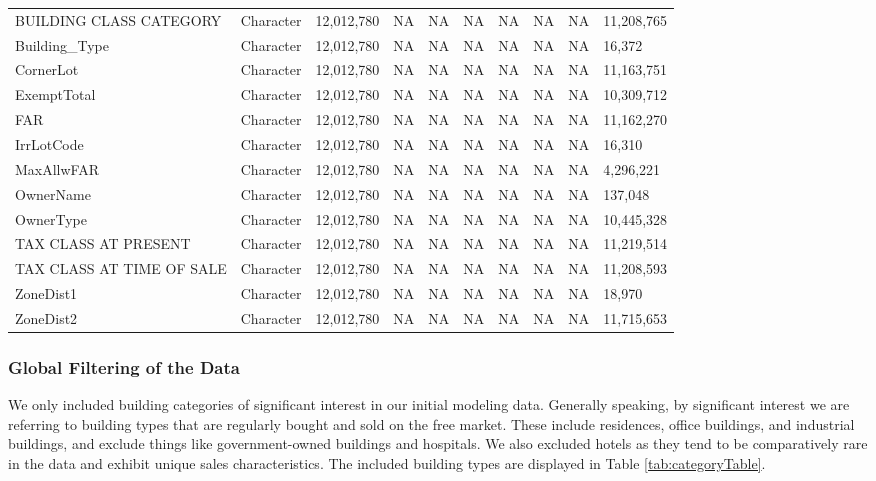 \documentclass[12pt,]{article}
\begin{document}
\begin{table}
{\begin{tabular}[t]{llllllllll}
\addlinespace
BUILDING CLASS CATEGORY & Character & 12,012,780 & NA & NA & NA & NA & NA & NA & 11,208,765\\
Building\_Type & Character & 12,012,780 & NA & NA & NA & NA & NA & NA & 16,372\\
CornerLot & Character & 12,012,780 & NA & NA & NA & NA & NA & NA & 11,163,751\\
ExemptTotal & Character & 12,012,780 & NA & NA & NA & NA & NA & NA & 10,309,712\\
FAR & Character & 12,012,780 & NA & NA & NA & NA & NA & NA & 11,162,270\\
\addlinespace
IrrLotCode & Character & 12,012,780 & NA & NA & NA & NA & NA & NA & 16,310\\
MaxAllwFAR & Character & 12,012,780 & NA & NA & NA & NA & NA & NA & 4,296,221\\
OwnerName & Character & 12,012,780 & NA & NA & NA & NA & NA & NA & 137,048\\
OwnerType & Character & 12,012,780 & NA & NA & NA & NA & NA & NA & 10,445,328\\
TAX CLASS AT PRESENT & Character & 12,012,780 & NA & NA & NA & NA & NA & NA & 11,219,514\\
\addlinespace
TAX CLASS AT TIME OF SALE & Character & 12,012,780 & NA & NA & NA & NA & NA & NA & 11,208,593\\
ZoneDist1 & Character & 12,012,780 & NA & NA & NA & NA & NA & NA & 18,970\\
ZoneDist2 & Character & 12,012,780 & NA & NA & NA & NA & NA & NA & 11,715,653\\
\bottomrule
\end{tabular}}
\end{table}

\hypertarget{global-filtering-of-the-data}{%
\subsubsection{Global Filtering of the
Data}\label{global-filtering-of-the-data}}

We only included building categories of significant interest in our
initial modeling data. Generally speaking, by significant interest we
are referring to building types that are regularly bought and sold on
the free market. These include residences, office buildings, and
industrial buildings, and exclude things like government-owned buildings
and hospitals. We also excluded hotels as they tend to be comparatively
rare in the data and exhibit unique sales characteristics. The included
building types are displayed in Table \ref{tab:categoryTable}.
\end{document}
